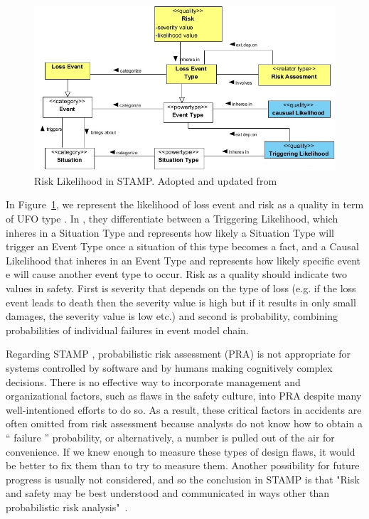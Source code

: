\documentclass[sw]{iosart2x}
\begin{document}
\begin{figure}
\begin{center}
\includegraphics[width=\textwidth]{riskpr.jpg}
\end{center}
\caption{Risk Likelihood in STAMP. Adopted and updated  from~\cite{unknown}ِ}
\label{fig:riskpr}
\end{figure} 
In Figure~\ref{fig:riskpr}, we represent the likelihood of loss event and risk as a quality in term of UFO type \cite{CARVALHO20173, gagc2015toap}. In \cite{unknown}, they differentiate between a Triggering Likelihood, which inheres in a Situation Type and represents how likely a Situation Type will trigger an Event Type once a situation of this type becomes a fact, and a Causal Likelihood that inheres in an Event Type and represents how likely specific event e will cause another event type to occur. Risk as a quality should indicate two values in safety. First is severity that depends on the type of loss (e.g. if the loss event leads to death then the severity value is high but if it results in only small damages, the severity value is low etc.) and second is probability, combining probabilities of individual failures in event model chain.

 Regarding STAMP \cite{leveson2012engineering}, probabilistic risk assessment (PRA) is not appropriate for systems controlled by software and by humans making cognitively complex decisions. There is no effective way to incorporate management and organizational factors, such as flaws in the safety culture, into PRA despite many well-intentioned efforts to do so. As a result, these critical factors in accidents are often omitted from risk assessment because analysts do not know how to obtain a “ failure ” probability, or alternatively, a number is pulled out of the air for convenience. If we knew enough to measure these types of design flaws, it would be better to fix them than to try to measure them. Another possibility for future progress is usually not considered, and so the conclusion in STAMP is that "Risk and safety may be best understood and communicated in ways other than probabilistic risk analysis"~\cite{leveson2012engineering}.
 
\end{document}
